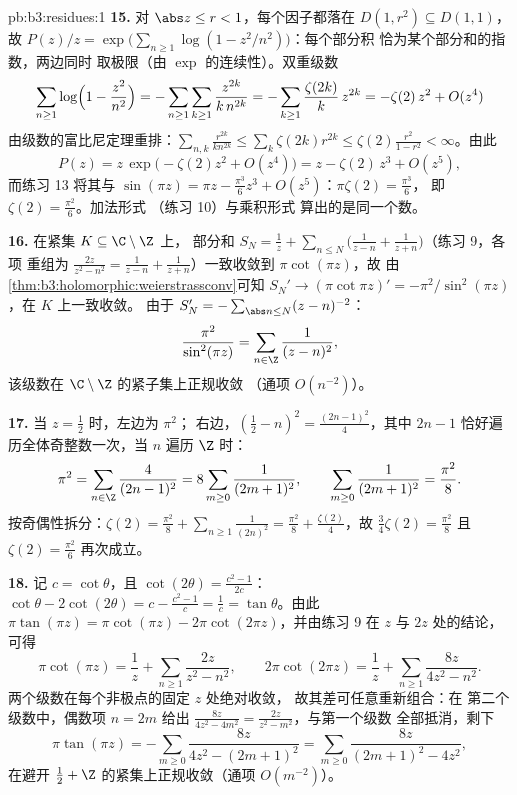 \begin{solution}{pb:b3:residues:1}
\textbf{15.} 对 $\abs z \leq r < 1$，每个因子都落在
$D(1, r^2) \subseteq D(1, 1)$，故 $P(z)/z = \exp\bigl(
\sum_{n\geq1}\log(1 - z^2/n^2)\bigr)$：每个部分积
恰为某个部分和的指数，两边同时
取极限（由 $\exp$ 的连续性）。双重级数
\[
\sum_{n\geq1}\log\Bigl(1 - \frac{z^2}{n^2}\Bigr)
= -\sum_{n\geq1}\sum_{k\geq1}\frac{z^{2k}}{k\,n^{2k}}
= -\sum_{k\geq1}\frac{\zeta(2k)}k\,z^{2k}
= -\zeta(2)\,z^2 + O(z^4)
\]
由级数的富比尼定理重排：$\sum_{n,k}
\frac{r^{2k}}{kn^{2k}} \leq \sum_k\zeta(2k)r^{2k} \leq
\zeta(2)\frac{r^2}{1-r^2} < \infty$。由此
\[
P(z) = z\,\exp\bigl(-\zeta(2)z^2 + O(z^4)\bigr)
= z - \zeta(2)\,z^3 + O(z^5) ,
\]
而练习 13 将其与 $\sin(\pi z) = \pi z -
\frac{\pi^3}6z^3 + O(z^5)$：$\pi\zeta(2) = \frac{\pi^3}6$，
即 $\zeta(2) = \frac{\pi^2}6$。加法形式
（练习 10）与乘积形式
算出的是同一个数。

\textbf{16.} 在紧集 $K \subseteq \C\setminus\Z$ 上，
部分和 $S_N = \frac1z + \sum_{n\leq N}\bigl(
\frac1{z-n} + \frac1{z+n}\bigr)$（练习 9，各项
重组为 $\frac{2z}{z^2-n^2} = \frac1{z-n} +
\frac1{z+n}$）一致收敛到 $\pi\cot(\pi z)$，故
由\cref{thm:b3:holomorphic:weierstrassconv}可知 $S_N' \to
(\pi\cot\pi z)' = -\pi^2/\sin^2(\pi z)$，在 $K$ 上一致收敛。
由于 $S_N' = -\sum_{\abs n\leq N}(z - n)^{-2}$：
\[
\frac{\pi^2}{\sin^2(\pi z)} =
\sum_{n\in\Z}\frac1{(z - n)^2} ,
\]
该级数在 $\C\setminus\Z$ 的紧子集上正规收敛
（通项 $O(n^{-2})$）。

\textbf{17.} 当 $z = \frac12$ 时，左边为 $\pi^2$；
右边，$(\frac12 - n)^2 = \frac{(2n-1)^2}4$，其中 $2n -
1$ 恰好遍历全体奇整数一次，当 $n$
遍历 $\Z$ 时：
\[
\pi^2 = \sum_{n\in\Z}\frac{4}{(2n-1)^2}
= 8\sum_{m\geq0}\frac1{(2m+1)^2},
\qquad
\sum_{m\geq0}\frac1{(2m+1)^2} = \frac{\pi^2}8 .
\]
按奇偶性拆分：$\zeta(2) = \frac{\pi^2}8 +
\sum_{n\geq1}\frac1{(2n)^2} = \frac{\pi^2}8 +
\frac{\zeta(2)}4$，故 $\frac34\zeta(2) = \frac{\pi^2}8$ 且
$\zeta(2) = \frac{\pi^2}6$ 再次成立。

\textbf{18.} 记 $c = \cot\theta$，且 $\cot(2\theta) =
\frac{c^2-1}{2c}$：$\cot\theta - 2\cot(2\theta) = c -
\frac{c^2-1}c = \frac1c = \tan\theta$。由此 $\pi\tan(\pi z)
= \pi\cot(\pi z) - 2\pi\cot(2\pi z)$，并由练习 9 在 $z$
与 $2z$ 处的结论，可得
\[
\pi\cot(\pi z) = \frac1z +
\sum_{n\geq1}\frac{2z}{z^2 - n^2},
\qquad
2\pi\cot(2\pi z) = \frac1z +
\sum_{n\geq1}\frac{8z}{4z^2 - n^2} .
\]
两个级数在每个非极点的固定 $z$ 处绝对收敛，
故其差可任意重新组合：在
第二个级数中，偶数项 $n = 2m$ 给出 $\frac{8z}{4z^2 -
4m^2} = \frac{2z}{z^2 - m^2}$，与第一个级数
全部抵消，剩下
\[
\pi\tan(\pi z) = -\sum_{m\geq0}\frac{8z}{4z^2 - (2m+1)^2}
= \sum_{m\geq0}\frac{8z}{(2m+1)^2 - 4z^2} ,
\]
在避开 $\frac12 + \Z$ 的紧集上正规收敛（通项
$O(m^{-2})$）。


\end{solution}
